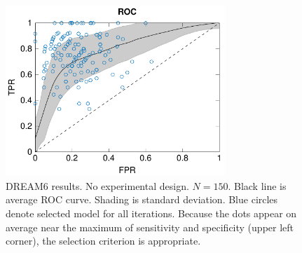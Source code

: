 \documentclass{bioinfo}
\begin{document}
\begin{methods}
%
%
%
%
%
%
%
%
%


\end{methods}

\begin{figure}[!tpb]%
\centerline{\includegraphics[width=235pt]{Figures/ROC.pdf}}
\caption{DREAM6 results. No experimental design. $N = 150$. Black line is average ROC curve. Shading is standard deviation. Blue circles denote selected model for all iterations. Because the dots appear on average near the maximum of sensitivity and specificity (upper left corner), the selection criterion is appropriate.}\label{fig:01}
\end{figure}
\end{document}
